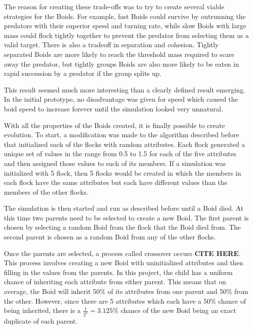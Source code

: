\documentclass{egpubl}
\begin{document}
The reason for creating these trade-offs was to try to create several viable strategies for the Boids. For example, fast Boids could survive by outrunning the predators with their superior speed and turning rate, while slow Boids with large mass could flock tightly together to prevent the predator from selecting them as a valid target. There is also a tradeoff in separation and cohesion. Tightly separated Boids are more likely to reach the threshold mass required to scare away the predator, but tightly groups Boids are also more likely to be eaten in rapid succession by a predator if the group splits up.
\par
This result seemed much more interesting than a clearly defined result emerging. In the initial prototype, no disadvantage was given for speed which caused the boid speed to increase forever until the simulation looked very unnatural. 
\par
With all the properties of the Boids created, it is finally possible to create evolution. To start, a modification was made to the algorithm described before that initialized each of the flocks with random attributes. Each flock generated a unique set of values in the range from 0.5 to 1.5 for each of the five attributes and then assigned those values to each of its members. If a simulation was initialized with 5 flock, then 5 flocks would be created in which the members in each flock have the same attributes but each have different values than the members of the other flocks.
\par
The simulation is then started and run as described before until a Boid died. At this time two parents need to be selected to create a new Boid. The first parent is chosen by selecting a random Boid from the flock that the Boid died from. The second parent is chosen as a random Boid from any of the other flocks.
\par
Once the parents are selected, a process called crossover occurs \textbf{CITE HERE}. This process involves creating a new Boid with uninitialized attributes and then filling in the values from the parents. In this project, the child has a uniform chance of inheriting each attribute from either parent. This means that on average, the Boid will inherit 50\% of its attributes from one parent and 50\% from the other. However, since there are 5 attributes which each have a 50\% chance of being inherited, there is a $\frac{1}{2^5} = 3.125\%$ chance of the new Boid being an exact duplicate of each parent.
\end{document}
